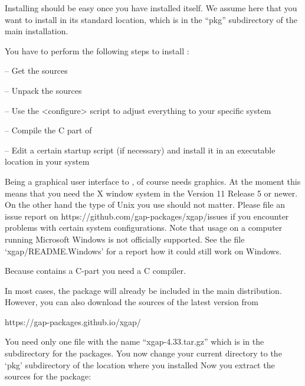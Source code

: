 
Installing {\XGAP} should be easy once you have installed {\GAP} itself. We
assume here that you want to install {\XGAP} in its standard location,
which is in the ``pkg'' subdirectory of the main {} installation.


You have to perform the following steps to install {\XGAP}:

\beginlist
\item{--} Get the sources
\item{--} Unpack the sources
\item{--} Use the <configure> script to adjust everything to your specific
  system
\item{--} Compile the C part of {\XGAP}
\item{--} Edit a certain startup script (if necessary) and install it in 
      an executable location in your system
\endlist


Being a graphical user interface to {\GAP}, {\XGAP} of course needs
graphics. At the moment this means that you need the X window system in the 
Version 11 Release 5 or newer. On the other hand the type of Unix you use 
should not matter. Please file an issue report on
\begintt
https://github.com/gap-packages/xgap/issues
\endtt
if you encounter problems with certain system configurations.
Note that usage on 
a computer running Microsoft Windows is not officially supported. 
See the file `xgap/README.Windows' for a report how it could
still work on Windows. 

Because {\XGAP} contains a C-part you need a C compiler.


In most cases, the {\XGAP} package will already be included in the main
distribution. However, you can also download the sources of the latest
version from

\begintt
https://gap-packages.github.io/xgap/
\endtt

You need only one file with the name ``xgap-4.33.tar.gz''
which is in the subdirectory for the packages.
You now change your current directory to the `pkg' subdirectory of the 
location where you installed
{\GAP}
Now you extract the sources for the {\XGAP} package:

